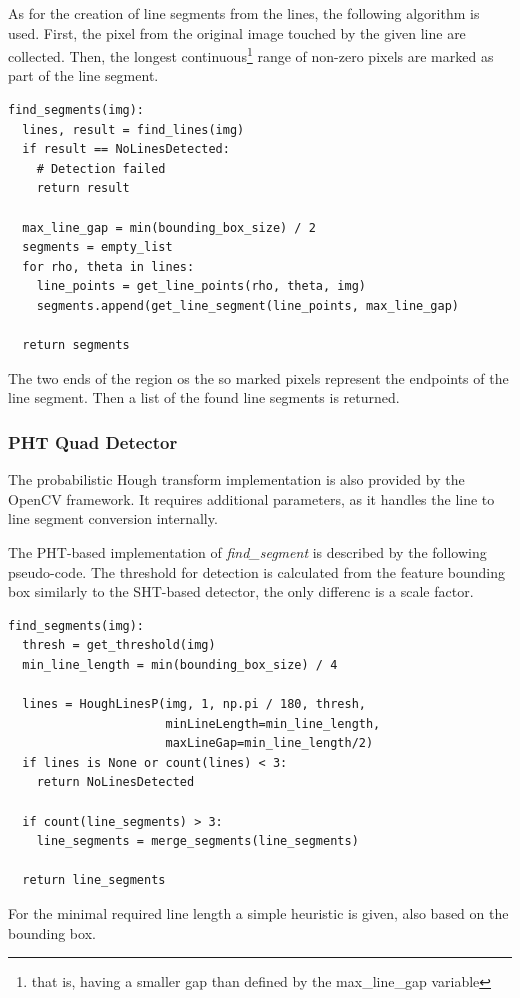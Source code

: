 As for the creation of line segments from the lines, the following algorithm is used.
First, the pixel from the original image touched by the given line are collected.
Then, the longest continuous\footnote{that is, having a smaller gap than defined by the max\_line\_gap variable} range of non-zero pixels are marked as part of the line segment.
\begin{lstlisting}
find_segments(img):
  lines, result = find_lines(img)
  if result == NoLinesDetected:
    # Detection failed
    return result
	
  max_line_gap = min(bounding_box_size) / 2
  segments = empty_list
  for rho, theta in lines:
    line_points = get_line_points(rho, theta, img)
    segments.append(get_line_segment(line_points, max_line_gap)
	
  return segments
\end{lstlisting}
The two ends of the region os the so marked pixels represent the endpoints of the line segment.
Then a list of the found line segments is returned.

\subsubsection{PHT Quad Detector}

The probabilistic Hough transform implementation is also provided by the OpenCV framework.
It requires additional parameters, as it handles the line to line segment conversion internally.

The PHT-based implementation of \textit{find\_segment} is described by the following pseudo-code.
The threshold for detection is calculated from the feature bounding box similarly to the SHT-based detector, the only differenc is a scale factor.
\begin{lstlisting}
find_segments(img):
  thresh = get_threshold(img)
  min_line_length = min(bounding_box_size) / 4

  lines = HoughLinesP(img, 1, np.pi / 180, thresh, 
                      minLineLength=min_line_length, 
                      maxLineGap=min_line_length/2)
  if lines is None or count(lines) < 3:
    return NoLinesDetected

  if count(line_segments) > 3:
    line_segments = merge_segments(line_segments)
				
  return line_segments
\end{lstlisting}
For the minimal required line length a simple heuristic is given, also based on the bounding box.

